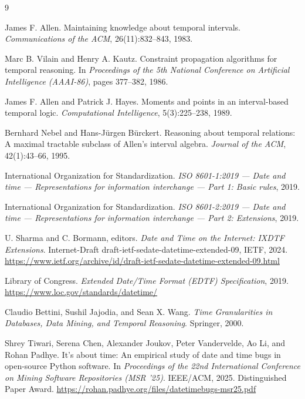 \begin{thebibliography}{9}

  James F. Allen.
  \newblock Maintaining knowledge about temporal intervals.
  \newblock \emph{Communications of the ACM}, 26(11):832--843, 1983.
  \newblock {}

  Marc B. Vilain and Henry A. Kautz.
  \newblock Constraint propagation algorithms for temporal reasoning.
  \newblock In \emph{Proceedings of the 5th National Conference on
  Artificial Intelligence (AAAI-86)}, pages 377--382, 1986.

  James F. Allen and Patrick J. Hayes.
  \newblock Moments and points in an interval-based temporal logic.
  \newblock \emph{Computational Intelligence}, 5(3):225--238, 1989.
  \newblock {}

  Bernhard Nebel and Hans-J\"urgen B\"urckert.
  \newblock Reasoning about temporal relations: A maximal tractable
  subclass of Allen's interval algebra.
  \newblock \emph{Journal of the ACM}, 42(1):43--66, 1995.
  \newblock {}

  International Organization for Standardization.
  \newblock \emph{ISO 8601-1:2019 --- Date and time --- Representations
  for information interchange --- Part 1: Basic rules}, 2019.

  International Organization for Standardization.
  \newblock \emph{ISO 8601-2:2019 --- Date and time --- Representations
  for information interchange --- Part 2: Extensions}, 2019.

  U. Sharma and C. Bormann, editors.
  \newblock \emph{Date and Time on the Internet: IXDTF Extensions}.
  \newblock Internet-Draft draft-ietf-sedate-datetime-extended-09,
  IETF, 2024.
  \newblock \url{https://www.ietf.org/archive/id/draft-ietf-sedate-datetime-extended-09.html}

  Library of Congress.
  \newblock \emph{Extended Date/Time Format (EDTF) Specification}, 2019.
  \newblock \url{https://www.loc.gov/standards/datetime/}

  Claudio Bettini, Sushil Jajodia, and Sean X. Wang.
  \newblock \emph{Time Granularities in Databases, Data Mining, and
  Temporal Reasoning}.
  \newblock Springer, 2000.

  Shrey Tiwari, Serena Chen, Alexander Joukov, Peter Vandervelde,
  Ao Li, and Rohan Padhye.
  \newblock It's about time: An empirical study of date and time bugs
  in open-source Python software.
  \newblock In \emph{Proceedings of the 22nd International Conference
  on Mining Software Repositories (MSR '25)}. IEEE/ACM, 2025.
  \newblock Distinguished Paper Award.
  \newblock \url{https://rohan.padhye.org/files/datetimebugs-msr25.pdf}


\end{thebibliography}
